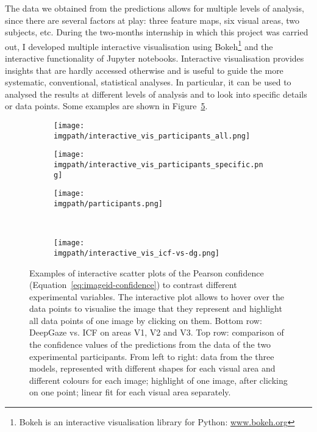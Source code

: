 {The data we obtained from the predictions allows for multiple levels of analysis, since there are several factors at play: three feature maps, six visual areas, two subjects, etc. During the two-months internship in which this project was carried out, I developed multiple interactive visualisation using Bokeh\footnote{Bokeh is an interactive visualisation library for Python: \href{https://bokeh.org/}{www.bokeh.org}} and the interactive functionality of Jupyter notebooks. Interactive visualisation provides insights that are hardly accessed otherwise and is useful to guide the more systematic, conventional, statistical analyses. In particular, it can be used to analysed the results at different levels of analysis and to look into specific details or data points. Some examples are shown in Figure~\ref{fig:imageid-interactive_visualisation}.

\begin{figure}[htb]
  \centering
  \begin{subfigure}{0.32 \linewidth}
      \texttt{[image: \\imgpath/interactive\_vis\_participants\_all.png]}
      \label{fig:imageid-participants_all}
  \end{subfigure}
  \begin{subfigure}{0.32 \linewidth}
      \texttt{[image: \\imgpath/interactive\_vis\_participants\_specific.png]}
      \label{fig:imageid-participants_specific}
  \end{subfigure}
  \begin{subfigure}{0.32 \linewidth}
      \texttt{[image: \\imgpath/participants.png]}
      \label{fig:imageid-participants_fit}
  \end{subfigure}
  \\
  \begin{subfigure}{\linewidth}
      \texttt{[image: \\imgpath/interactive\_vis\_icf-vs-dg.png]}
      \label{fig:imageid-icf_vs_dg}
  \end{subfigure}
  \caption{Examples of interactive scatter plots of the Pearson confidence (Equation~\ref{eq:imageid-confidence}) to contrast different experimental variables. The interactive plot allows to hover over the data points to visualise the image that they represent and highlight all data points of one image by clicking on them. Bottom row: DeepGaze vs. ICF on areas V1, V2 and V3. Top row: comparison of the confidence values of the predictions from the data of the two experimental participants. From left to right: data from the three models, represented with different shapes for each visual area and different colours for each image; highlight of one image, after clicking on one point; linear fit for each visual area separately.}
  \label{fig:imageid-interactive_visualisation}
\end{figure}

}
